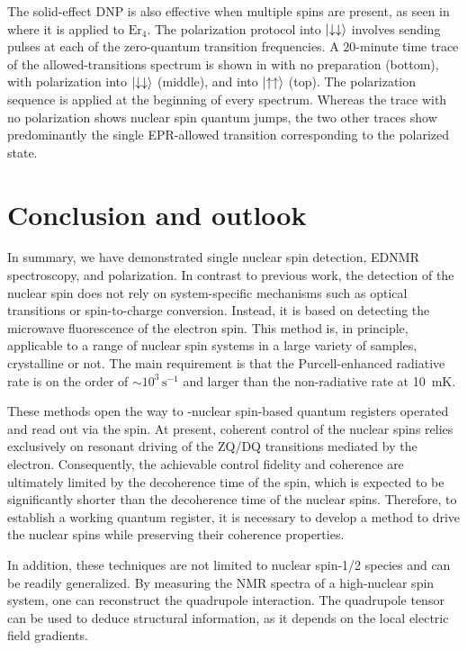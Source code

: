 The solid-effect DNP is also effective when multiple spins are present, as seen in  where it is applied to $\mathrm{Er}_4$. The polarization protocol into $\ket{\downarrow \downarrow}$ involves sending pulses at each of the zero-quantum transition frequencies. A $20$-minute time trace of the allowed-transitions spectrum is shown in  with no preparation (bottom), with polarization into $\ket{\downarrow \downarrow}$ (middle), and into $\ket{\uparrow \uparrow}$ (top). The polarization sequence is applied at the beginning of every spectrum. Whereas the trace with no polarization shows nuclear spin quantum jumps, the two other traces show predominantly the single EPR-allowed transition corresponding to the polarized state.

\section{Conclusion and outlook}

In summary, we have demonstrated single \W nuclear spin detection, EDNMR spectroscopy, and polarization. In contrast to previous work, the detection of the nuclear spin does not rely on system-specific mechanisms such as optical transitions or spin-to-charge conversion. Instead, it is based on detecting the microwave fluorescence of the electron spin. This method is, in principle, applicable to a range of nuclear spin systems in a large variety of samples, crystalline or not. The main requirement is that the Purcell-enhanced radiative rate is on the order of $\sim 10^3\,\mathrm{s}^{-1}$ and larger than the non-radiative rate at 10~mK.

These methods open the way to \W-nuclear spin-based quantum registers operated and read out via the \Er spin. At present, coherent control of the nuclear spins relies exclusively on resonant driving of the ZQ/DQ transitions mediated by the electron. Consequently, the achievable control fidelity and coherence are ultimately limited by the decoherence time of the \Er spin, which is expected to be significantly shorter than the decoherence time of the \W nuclear spins. Therefore, to establish a working quantum register, it is necessary to develop a method to drive the \W nuclear spins while preserving their coherence properties.

In addition, these techniques are not limited to nuclear spin-1/2 species and can be readily generalized. By measuring the NMR spectra of a high-nuclear spin system, one can reconstruct the quadrupole interaction. The quadrupole tensor can be used to deduce structural information, as it depends on the local electric field gradients.


